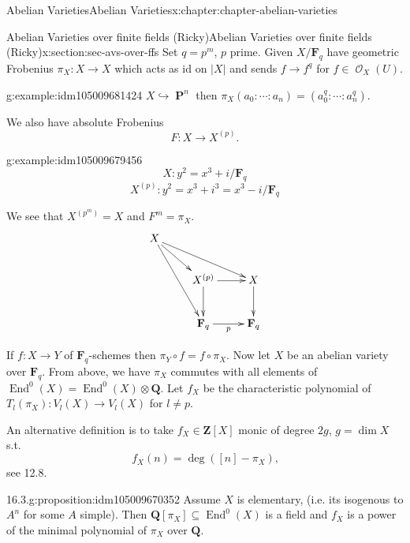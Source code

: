 \documentclass[oneside,10pt,]{book}
\numberwithin{equation}{section}
\newcommand{\sheaf}[1]{\operatorname{\mathcal{#1}}}
\newcommand{\lb}{[}
\newcommand{\rb}{]}
\newcommand{\ZZ}{\mathbf{Z}}
\newcommand{\QQ}{\mathbf{Q}}
\newcommand{\FF}{\mathbf{F}}
\newcommand{\id}{\mathrm{id}}
\DeclareMathOperator{\End}{End}
\DeclareMathOperator{\PP}{\mathbf{P}}
\begin{document}
\begin{chapterptx}{Abelian Varieties}{}{Abelian Varieties}{}{}{x:chapter:chapter-abelian-varieties}
%
%
\typeout{************************************************}
\typeout{************************************************}
%
\begin{sectionptx}{Abelian Varieties over finite fields (Ricky)}{}{Abelian Varieties over finite fields (Ricky)}{}{}{x:section:sec-avs-over-ffs}
Set \(q = p^m\), \(p\) prime. Given \(X/\FF_q\) have  geometric Frobenius \(\pi_X\colon X \to X\) which acts as \(\id\) on \(|X|\) and sends \(f\to f^q\) for \(f\in \sheaf O_X(U)\).%
\begin{example}{}{g:example:idm105009681424}%
\(X \hookrightarrow \PP^n\) then \(\pi_X(a_0:\cdots :a_n) = (a_0^q : \cdots :a_n^q)\).%
\end{example}
We also have absolute Frobenius%
\begin{equation*}
F\colon X\to X^{(p)}\text{.}
\end{equation*}
%
\begin{example}{}{g:example:idm105009679456}%
%
\begin{equation*}
X \colon y^2 = x^3 + i / \FF_q
\end{equation*}
%
\begin{equation*}
X^{(p)} \colon y^2 = x^3 + i^3 = x^3 - i / \FF_q
\end{equation*}
%
\end{example}
We see that \(X^{(p^m)} = X\) and \(F^m = \pi_X\).%
\begin{equation*}
\xymatrix{
X \ar[drr] \ar[dr]\ar[ddr] & &\\
& X^{(p)} \ar[d]\ar[r] & X\ar[d]\\
& \FF_q \ar[r]_p &\FF_q
}
\end{equation*}
%
\par
If \(f\colon X \to Y\) of \(\FF_q\)-schemes then \(\pi_Y \circ f = f\circ \pi_X\). Now let \(X\) be an abelian variety over \(\FF_q\). From above, we have \(\pi_X\) commutes with all elements of \(\End^0(X) = \End^0(X)\otimes \QQ\). Let \(f_X\) be the characteristic polynomial of \(T_l(\pi_X) \colon V_l(X) \to V_l(X)\) for \(l \ne p\).%
\par
An alternative definition is to take \(f_X\in \ZZ\lb X\rb\) monic of degree \(2g \), \(g = \dim X\) s.t.%
\begin{equation*}
f_X(n) = \deg([n] -\pi_X)\text{,}
\end{equation*}
see 12.8.%
\begin{proposition}{16.3.}{}{g:proposition:idm105009670352}%
Assume \(X\) is elementary, (i.e. its isogenous to \(A^n\) for some \(A\) simple). Then  \(\QQ\lb \pi_X\rb\subseteq \End^0(X)\) is a field and \(f_X\) is a power of the minimal polynomial of \(\pi_X\) over \(\QQ\).%

\end{proposition}
\end{sectionptx}
\end{chapterptx}
\end{document}
